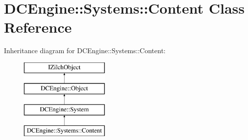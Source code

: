 \hypertarget{classDCEngine_1_1Systems_1_1Content}{\section{D\-C\-Engine\-:\-:Systems\-:\-:Content Class Reference}
\label{classDCEngine_1_1Systems_1_1Content}
}
Inheritance diagram for D\-C\-Engine\-:\-:Systems\-:\-:Content\-:\begin{figure}[H]
\begin{center}
\leavevmode
\includegraphics[height=4.000000cm]{classDCEngine_1_1Systems_1_1Content}
\end{center}
\end{figure}
